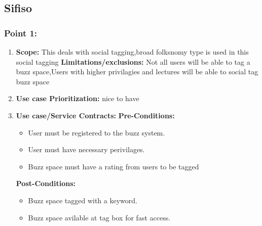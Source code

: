 \documentclass[11pt]{article}
\begin{document}
\newpage

\subsection{Sifiso}
\subsubsection{Point 1:} 
\begin{enumerate}
\item 
\textbf{Scope:}
This deals with social tagging,broad folksnomy type is used in this social tagging
\newline
\textbf{Limitations/exclusions:} 
Not all users will be able to tag a buzz space,Users with higher privilagies and lectures will be able to social tag buzz space

\item 
\textbf{Use case Prioritization:} nice to have

\item 
\textbf{Use case/Service Contracts:} 
\newline
\textbf{Pre-Conditions: }
\begin{itemize}
\item User must be registered to the buzz system.
\item User must have necessary perivilages.
\item Buzz space must have a rating from users to be tagged
\end{itemize}
 

\textbf{Post-Conditions: }
\begin{itemize}
\item Buzz space tagged with a keyword.
\item Buzz space avilable at tag box for fast access.
\end{itemize}
\end{enumerate}
\end{document}
